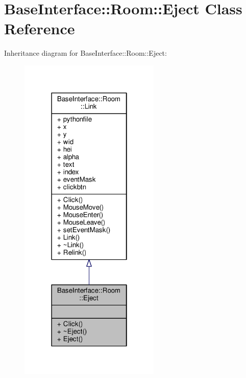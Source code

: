 \hypertarget{classBaseInterface_1_1Room_1_1Eject}{}\section{Base\+Interface\+:\+:Room\+:\+:Eject Class Reference}
\label{classBaseInterface_1_1Room_1_1Eject}


Inheritance diagram for Base\+Interface\+:\+:Room\+:\+:Eject\+:
\nopagebreak
\begin{figure}[H]
\begin{center}
\leavevmode
\includegraphics[width=190pt]{d0/d8e/classBaseInterface_1_1Room_1_1Eject__inherit__graph}
\end{center}
\end{figure}


